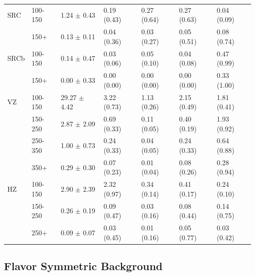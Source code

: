 \begin{table}[!h]
\begin{center}
\begin{tabular} {l |l | l | l | l | l | l}
            SRC & 100-150 & 1.24 $\pm$ 0.43 & 0.19 (0.43) & 0.27 (0.64) & 0.27 (0.63) & 0.04 (0.09) \\
            & 150+ & 0.13 $\pm$ 0.11 & 0.04 (0.36) & 0.03 (0.27) & 0.05 (0.51) & 0.08 (0.74) \\ \hline


            SRCb & 100-150 & 0.14 $\pm$ 0.47 & 0.03 (0.06) & 0.05 (0.10) & 0.04 (0.08) & 0.47 (0.99) \\
            & 150+ & 0.00 $\pm$ 0.33 & 0.00 (0.00) & 0.00 (0.00) & 0.00 (0.00) & 0.33 (1.00) \\ \hline


            VZ & 100-150 & 29.27 $\pm$ 4.42 & 3.22 (0.73) & 1.13 (0.26) & 2.15 (0.49) & 1.81 (0.41) \\
            & 150-250 & 2.87 $\pm$ 2.09 & 0.69 (0.33) & 0.11 (0.05) & 0.40 (0.19) & 1.93 (0.92) \\
            & 250-350 & 1.00 $\pm$ 0.73 & 0.24 (0.33) & 0.04 (0.05) & 0.24 (0.33) & 0.64 (0.88) \\
            & 350+ & 0.29 $\pm$ 0.30 & 0.07 (0.23) & 0.01 (0.04) & 0.08 (0.26) & 0.28 (0.94) \\ \hline


            HZ & 100-150 & 2.90 $\pm$ 2.39 & 2.32 (0.97) & 0.34 (0.14) & 0.41 (0.17) & 0.24 (0.10) \\
            & 150-250 & 0.26 $\pm$ 0.19 & 0.09 (0.47) & 0.03 (0.16) & 0.08 (0.44) & 0.14 (0.75) \\
            & 250+ & 0.09 $\pm$ 0.07 & 0.03 (0.45) & 0.01 (0.16) & 0.05 (0.77) & 0.03 (0.42) \\ \hline

          \end{tabular}
        \end{center}
      \end{table}

  \clearpage

  \subsection{Flavor Symmetric Background} \label{sec:flavor_symmetric_background}
    
